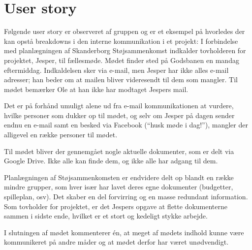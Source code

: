 \section{User story}
Følgende user story er observeret af gruppen og er et eksempel på hvorledes der kan opstå breakdowns i den interne kommunikation i et projekt:
I forbindelse med planlægningen af Skanderborg Støjsammenkomst indkalder tovholderen for projektet, Jesper, til fællesmøde. Mødet finder sted på Godsbanen en mandag eftermiddag. Indkaldelsen sker via e-mail, men Jesper har ikke alles e-mail adresser; han beder om at mailen bliver videresendt til dem som mangler. Til mødet bemærker Ole at han ikke har modtaget Jespers mail.

Det er på forhånd umuligt alene ud fra e-mail kommunikationen at vurdere, hvilke personer som dukker op til mødet, og selv om Jesper på dagen sender endnu en e-mail samt en besked via Facebook (“husk møde i dag!”), mangler der alligevel en række personer til mødet.

Til mødet bliver der gennemgået nogle aktuelle dokumenter, som er delt via Google Drive. Ikke alle kan finde dem, og ikke alle har adgang til dem.

Planlægningen af Støjsammenkomsten er endvidere delt op blandt en række mindre grupper, som hver især har lavet deres egne dokumenter (budgetter, spilleplan, osv). Det skaber en del forvirring og en masse redundant information. Som tovholder for projektet, er det Jespers opgave at flette dokumenterne sammen i sidste ende, hvilket er et stort og kedeligt stykke arbejde.

I slutningen af mødet kommenterer én, at meget af mødets indhold kunne være kommunikeret på andre måder og at mødet derfor har været unødvendigt.
